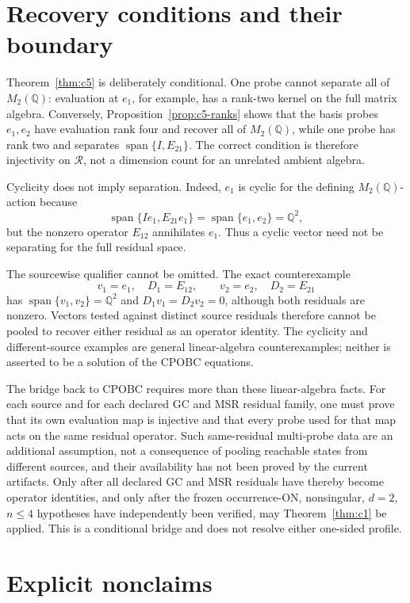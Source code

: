 \documentclass[11pt]{article}
\theoremstyle{definition}
\theoremstyle{remark}
\newcommand{\QQ}{\mathbb{Q}}
\begin{document}
\section{Recovery conditions and their boundary}

Theorem~\ref{thm:c5} is deliberately conditional.  One probe cannot
separate all of \(M_2(\QQ)\): evaluation at \(e_1\), for example, has a
rank-two kernel on the full matrix algebra.  Conversely,
Proposition~\ref{prop:c5-ranks} shows that the basis probes \(e_1,e_2\) have
evaluation rank four and recover all of \(M_2(\QQ)\), while one probe has
rank two and separates \(\operatorname{span}\{I,E_{21}\}\).  The correct
condition is therefore injectivity on \(\mathcal R\), not a dimension count
for an unrelated ambient algebra.

Cyclicity does not imply separation.  Indeed, \(e_1\) is cyclic for the
defining \(M_2(\QQ)\)-action because
\[
  \operatorname{span}\{Ie_1,E_{21}e_1\}
  =\operatorname{span}\{e_1,e_2\}=\QQ^2,
\]
but the nonzero operator \(E_{12}\) annihilates \(e_1\).  Thus a cyclic vector
need not be separating for the full residual space.

The sourcewise qualifier cannot be omitted.  The exact counterexample
\[
  v_1=e_1,\quad D_1=E_{12},\qquad
  v_2=e_2,\quad D_2=E_{21}
\]
has \(\operatorname{span}\{v_1,v_2\}=\QQ^2\) and
\(D_1v_1=D_2v_2=0\), although both residuals are nonzero.  Vectors tested
against distinct source residuals therefore cannot be pooled to recover
either residual as an operator identity.  The cyclicity and different-source
examples are general linear-algebra counterexamples; neither is asserted to
be a solution of the CPOBC equations.

The bridge back to CPOBC requires more than these linear-algebra facts.  For
each source and for each declared GC and MSR residual family, one must prove
that its own evaluation map is injective and that every probe used for that
map acts on the same residual operator.  Such same-residual multi-probe data
are an additional assumption, not a consequence of pooling reachable states
from different sources, and their availability has not been proved by the
current artifacts.  Only after all declared GC and MSR residuals have thereby
become operator identities, and only after the frozen occurrence-ON,
nonsingular, \(d=2\), \(n\leq4\) hypotheses have independently been verified,
may Theorem~\ref{thm:c1} be applied.  This is a conditional bridge and does
not resolve either one-sided profile.

\section{Explicit nonclaims}
\end{document}
